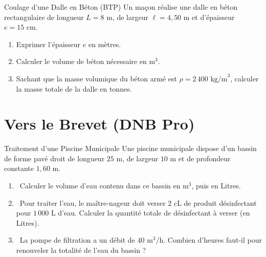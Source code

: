 \begin{exercice}[4 pts]{\capAnalyser}{Coulage d'une Dalle en Béton (BTP)}
Un maçon réalise une dalle en béton rectangulaire de longueur $L = 8\text{ m}$, de largeur $\ell = 4{,}50\text{ m}$ et d'épaisseur $e = 15\text{ cm}$.
\begin{enumerate}
    \item Exprimer l'épaisseur $e$ en mètres.
    \item Calculer le volume de béton nécessaire en $\text{m}^3$.
    \item Sachant que la masse volumique du béton armé est $\rho = 2\,400\text{ kg/m}^3$, calculer la masse totale de la dalle en tonnes.
\end{enumerate}
\lignesreponse[5]
\end{exercice}

\section{Vers le Brevet (DNB Pro)}

\begin{sujetdnb}{Traitement d'une Piscine Municipale}
Une piscine municipale dispose d'un bassin de forme pavé droit de longueur $25\text{ m}$, de largeur $10\text{ m}$ et de profondeur constante $1{,}60\text{ m}$.

\begin{enumerate}
    \item \capRealiser\ Calculer le volume d'eau contenu dans ce bassin en $\text{m}^3$, puis en Litres.
    \item \capAnalyser\ Pour traiter l'eau, le maître-nageur doit verser $2\text{ cL}$ de produit désinfectant pour $1\,000\text{ L}$ d'eau.
    Calculer la quantité totale de désinfectant à verser (en Litres).
    \item \capValider\ La pompe de filtration a un débit de $40\text{ m}^3/\text{h}$. Combien d'heures faut-il pour renouveler la totalité de l'eau du bassin ?
\end{enumerate}
\lignesreponse[6]
\end{sujetdnb}

